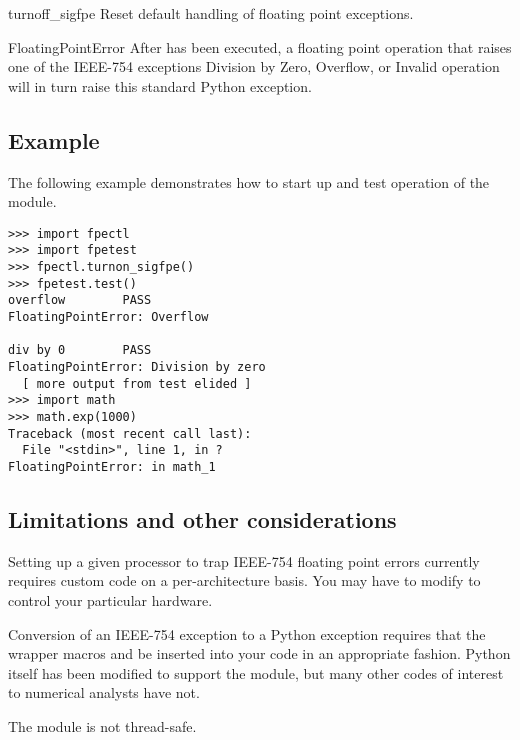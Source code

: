 \begin{funcdesc}{turnoff_sigfpe}{}
Reset default handling of floating point exceptions.
\end{funcdesc}

\begin{excdesc}{FloatingPointError}
After  has been executed,
a floating point operation that raises one of the
IEEE-754 exceptions
Division by Zero, Overflow, or Invalid operation
will in turn raise this standard Python exception.
\end{excdesc}


\subsection{Example \label{fpectl-example}}

The following example demonstrates how to start up and test operation of
the  module.

\begin{verbatim}
>>> import fpectl
>>> import fpetest
>>> fpectl.turnon_sigfpe()
>>> fpetest.test()
overflow        PASS
FloatingPointError: Overflow

div by 0        PASS
FloatingPointError: Division by zero
  [ more output from test elided ]
>>> import math
>>> math.exp(1000)
Traceback (most recent call last):
  File "<stdin>", line 1, in ?
FloatingPointError: in math_1
\end{verbatim}


\subsection{Limitations and other considerations}

Setting up a given processor to trap IEEE-754 floating point
errors currently requires custom code on a per-architecture basis.
You may have to modify  to control your particular hardware.

Conversion of an IEEE-754 exception to a Python exception requires
that the wrapper macros  and
 be inserted into your code in an appropriate
fashion.  Python itself has been modified to support the
 module, but many other codes of interest to numerical
analysts have not.

The  module is not thread-safe.

\begin{seealso}
\end{seealso}
